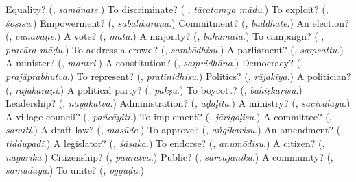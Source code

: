 \begin{tcolorbox}[breakable,colback=teal!4,colframe=teal!35!black,title={Before you move on}]
Equality? (\textbf{}, \emph{samānate}.) To discriminate? (\textbf{ }, \emph{tāratamya māḍu}.) To exploit? (\textbf{}, \emph{śōṣisu}.) Empowerment? (\textbf{}, \emph{sabalīkaraṇa}.) Commitment? (\textbf{}, \emph{baddhate}.) An election? (\textbf{}, \emph{cunāvaṇe}.) A vote? (\textbf{}, \emph{mata}.) A majority? (\textbf{}, \emph{bahumata}.) To campaign? (\textbf{ }, \emph{pracāra māḍu}.) To address a crowd? (\textbf{}, \emph{sambōdhisu}.) A parliament? (\textbf{}, \emph{saṃsattu}.) A minister? (\textbf{}, \emph{mantri}.) A constitution? (\textbf{}, \emph{saṃvidhāna}.) Democracy? (\textbf{}, \emph{prajāprabhutva}.) To represent? (\textbf{}, \emph{pratinidhisu}.) Politics? (\textbf{}, \emph{rājakīya}.) A politician? (\textbf{}, \emph{rājakāraṇi}.) A political party? (\textbf{}, \emph{pakṣa}.) To boycott? (\textbf{}, \emph{bahiṣkarisu}.) Leadership? (\textbf{}, \emph{nāyakatva}.) Administration? (\textbf{}, \emph{āḍaḷita}.) A ministry? (\textbf{}, \emph{sacivālaya}.) A village council? (\textbf{}, \emph{pañcāyiti}.) To implement? (\textbf{}, \emph{jārigoḷisu}.) A committee? (\textbf{}, \emph{samiti}.) A draft law? (\textbf{}, \emph{masūde}.) To approve? (\textbf{}, \emph{aṅgīkarisu}.) An amendment? (\textbf{}, \emph{tiddupaḍi}.) A legislator? (\textbf{}, \emph{śāsaka}.) To endorse? (\textbf{}, \emph{anumōdisu}.) A citizen? (\textbf{}, \emph{nāgarika}.) Citizenship? (\textbf{}, \emph{pauratva}.) Public? (\textbf{}, \emph{sārvajanika}.) A community? (\textbf{}, \emph{samudāya}.) To unite? (\textbf{}, \emph{oggūḍu}.)
\end{tcolorbox}
